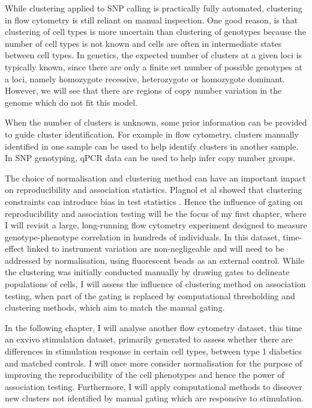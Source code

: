 While clustering applied to \gls{SNP} calling is practically fully automated,
clustering in flow cytometry is still reliant on manual inspection.
One good reason, is that
clustering of cell types is more uncertain than clustering of genotypes because the number of cell types is not known and
cells are often in intermediate states between cell types.
In genetics, the expected number of clusters at a given loci is typically known,
since there are only a finite set number of possible genotypes at a loci, namely homozygote recessive,
heterozygote or homozygote dominant.
However, we will see that there are regions of copy number variation in the genome
which do not fit this model.

When the number of clusters is unknown, some prior information can be provided to guide cluster identification.
For example in flow cytometry, clusters manually identified in one sample can be used to help identify clusters in another sample.
In SNP genotyping, qPCR data can be used to help infer copy number groups.

The choice of normalisation and clustering method can have an important impact on reproducibility and association statistics.
Plagnol et al showed that clustering constraints can introduce bias in test statistics \citep{Plagnol:2007dw}.
Hence the influence of gating on reproducibility and association testing will be the focus of my first chapter, where I will revisit a large,
long-running flow cytometry experiment designed to measure genotype-phenotype correlation in hundreds of individuals.
In this dataset, time-effect linked to instrument variation are non-negligeable and will need to be addressed by normalisation,
using fluorescent beads as an external control.
While the clustering was initially conducted manually by drawing gates to delineate populations of cells,
I will assess the influence of clustering method on association testing,
when part of the gating is replaced by computational thresholding and clustering methods, which aim
to match the manual gating.  

In the following chapter, I will analyse another flow cytometry dataset, this time an exvivo stimulation dataset,
primarily generated to assess whether there are differences in stimulation response in certain cell types, between type 1 diabetics and matched controls.
I will once more consider normalisation for the purpose of improving the reproducibility of the cell phenotypes and hence the power of association testing.
Furthermore, I will apply computational methods to discover new clusters not identified by manual gating which are responsive to stimulation.

